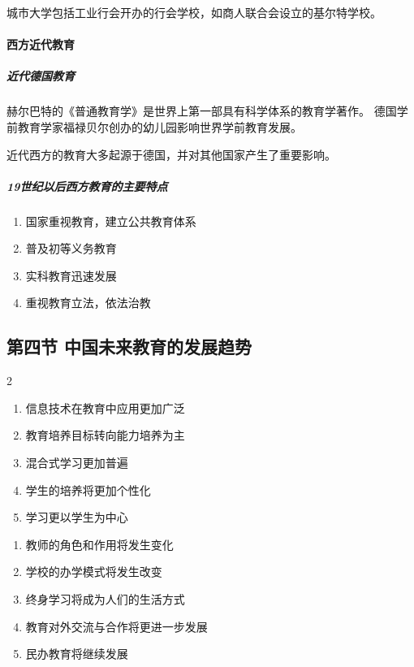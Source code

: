 \documentclass[b5paper,11pt]{article}
\begin{document}
城市大学包括工业行会开办的行会学校，如商人联合会设立的\textcolor{ctp-red}{基尔特学校}。

\paragraph{西方近代教育}
\subparagraph{近代德国教育}
\textcolor{ctp-red}{赫尔巴特}的\textcolor{ctp-green}{《普通教育学》}是世界上第一部具有科学体系的教育学著作。
德国学前教育学家\textcolor{ctp-red}{福禄贝尔}创办的\textcolor{ctp-red}{幼儿园}影响世界学前教育发展。

\vspace{0.6em}

\textcolor{ctp-lavender}{近代西方的教育大多起源于德国，并对其他国家产生了重要影响。}

\subparagraph{19世纪以后西方教育的主要特点}
\begin{enumerate}
  \item 国家重视教育，建立公共教育体系
  \item 普及初等义务教育
  \item 实科教育迅速发展
  \item 重视教育立法，依法治教
\end{enumerate}

\subsection{第四节 \space 中国未来教育的发展趋势}
\begingroup
{}
\setlength{\columnsep}{1em}
\begin{paracol}{2}

  \begin{enumerate}
    \item 信息技术在教育中应用更加广泛
    \item 教育培养目标转向能力培养为主
    \item 混合式学习更加普遍
    \item 学生的培养将更加个性化
    \item 学习更以学生为中心
  \end{enumerate}

  \switchcolumn

  \begin{enumerate}
    \item [6] 教师的角色和作用将发生变化
    \item [7] 学校的办学模式将发生改变
    \item [8] 终身学习将成为人们的生活方式
    \item [9] 教育对外交流与合作将更进一步发展
    \item [10] 民办教育将继续发展
  \end{enumerate}

\end{paracol}
\endgroup
\end{document}
